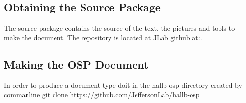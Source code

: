 \documentclass[12pt,letterpaper]{article}
\begin{document}
\subsection{Obtaining the Source Package}
\label{sec:obtain}

 The source package contains the source of the text, 
 the pictures and tools to make the document.
  The repository is located at JLab github at:\href{https://github.com/JeffersonLab/hallb-osp}.

\subsection{Making the OSP Document}
\label{sec:make}

  In order to produce a document type doit in the hallb-osp directory created by 
commanline
\> git clone https://github.com/JeffersonLab/hallb-osp
\end{document}
